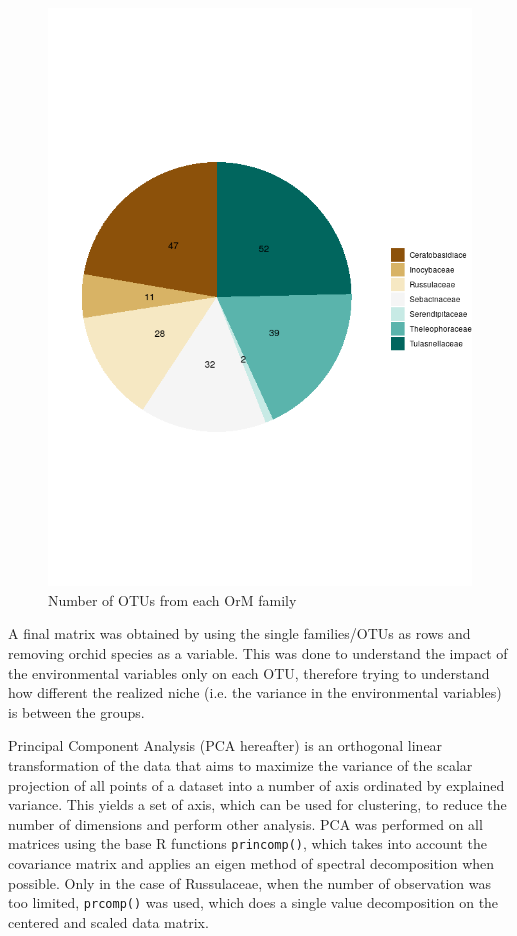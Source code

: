 \begin{figure}[htbp]
\centering
\includegraphics[keepaspectratio,width=\textwidth,height=0.75\textheight]{images/clust.png}
\caption{Number of OTUs from each OrM family}
\end{figure}

A final matrix was obtained by using the single families\slash OTUs as rows and removing orchid species as a variable. This was done to understand the impact of the environmental variables only on each OTU, therefore trying to understand how different the realized niche (i.e. the variance in the environmental variables) is between the groups.

Principal Component Analysis (PCA hereafter) is an orthogonal linear transformation of the data that aims to maximize the variance of the scalar projection of all points of a dataset into a number of axis ordinated by explained variance. This yields a set of axis, which can be used for clustering, to reduce the number of dimensions and perform other analysis. PCA was performed on all matrices using the base R functions \texttt{princomp()}, which takes into account the covariance matrix and applies an eigen method of spectral decomposition when possible. Only in the case of Russulaceae, when the number of observation was too limited, \texttt{prcomp()} was used, which does a single value decomposition on the centered and scaled data matrix.

